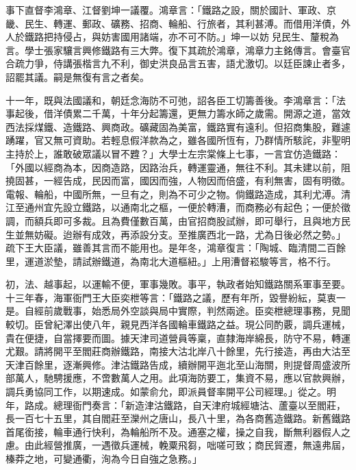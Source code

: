 \begin{pinyinscope}
事下直督李鴻章、江督劉坤一議覆。鴻章言：「鐵路之設，關於國計、軍政、京畿、民生、轉運、郵政、礦務、招商、輪船、行旅者，其利甚溥。而借用洋債，外人於鐵路把持侵占，與妨害國用諸端，亦不可不防。」坤一以妨兒民生、釐稅為言。學士張家驤言興修鐵路有三大弊。復下其疏於鴻章，鴻章力主銘傳言。會臺官合疏力爭，侍講張楷言九不利，御史洪良品言五害，語尤激切。以廷臣諫止者多，詔罷其議。嗣是無復有言之者矣。

十一年，既與法國議和，朝廷念海防不可弛，詔各臣工切籌善後。李鴻章言：「法事起後，借洋債累二千萬，十年分起籌還，更無力籌水師之歲需。開源之道，當效西法採煤鐵、造鐵路、興商政。礦藏固為美富，鐵路實有遠利。但招商集股，難遽踴躍，官又無可資助。若輕息假洋款為之，雖各國所恆有，乃群情所駭詫，非聖明主持於上，誰敢破眾議以冒不韙？」大學士左宗棠條上七事，一言宜仿造鐵路：「外國以經商為本，因商造路，因路治兵，轉運靈通，無往不利。其未建以前，阻撓固甚，一經告成，民因而富，國因而強，人物因而倍盛，有利無害，固有明徵。電報、輪船，中國所無，一旦有之，則為不可少之物。倘鐵路造成，其利尤溥。清江至通州宜先設立鐵路，以通南北之樞，一便於轉漕，而商務必有起色；一便於徵調，而額兵即可多裁。且為費僅數百萬，由官招商股試辦，即可舉行，且與地方民生並無妨礙。迨辦有成效，再添設分支。至推廣西北一路，尤為日後必然之勢。」疏下王大臣議，雖善其言而不能用也。是年冬，鴻章復言：「陶城、臨清間二百餘里，運道淤墊，請試辦鐵道，為南北大道樞紐。」上用漕督崧駿等言，格不行。

初，法、越事起，以運輸不便，軍事幾敗。事平，執政者始知鐵路關系軍事至要。十三年春，海軍衙門王大臣奕枻等言：「鐵路之議，歷有年所，毀譽紛紜，莫衷一是。自經前歲戰事，始悉局外空談與局中實際，判然兩途。臣奕枻總理事務，見聞較切。臣曾紀澤出使八年，親見西洋各國輪車鐵路之益。現公同酌覈，調兵運械，貴在便捷，自當擇要而圖。據天津司道營員等稟，直隸海岸綿長，防守不易，轉運尤艱。請將開平至閻莊商辦鐵路，南接大沽北岸八十餘里，先行接造，再由大沽至天津百餘里，逐漸興修。津沽鐵路告成，續辦開平迤北至山海關，則提督周盛波所部萬人，馳騁援應，不啻數萬人之用。此項海防要工，集資不易，應以官款興辦，調兵勇協同工作，以期速成。如蒙俞允，即派員督率開平公司經理。」從之。明年，路成。總理衙門奏言：「新造津沽鐵路，自天津府城經塘沽、蘆臺以至閻莊，長一百七十五里，其自閻莊至灤州之唐山，長八十里，為各商舊造鐵路。新舊鐵路首尾銜接，輪車通行快利，為輪船所不及。通塞之權，操之自我，斷無利器假人之慮。由此經營推廣，一遇徵兵運械，輓粟飛芻，咄嗟可致；商民貿遷，無遠弗屆，榛莽之地，可變通衢，洵為今日自強之急務。」


\end{pinyinscope}
